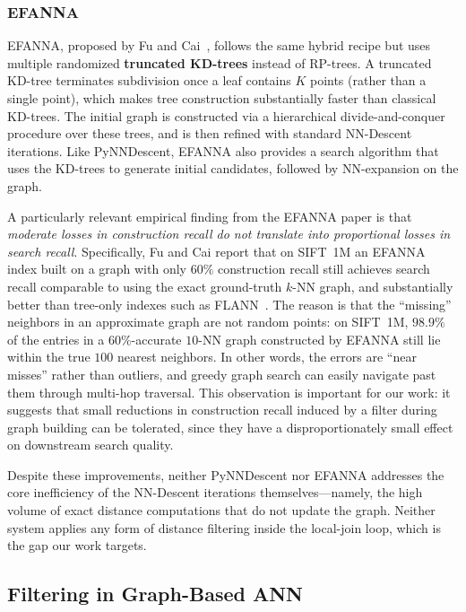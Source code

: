 \subsubsection{EFANNA}
\label{sec:efanna}

EFANNA, proposed by Fu and Cai~\cite{fu2016}, follows the same hybrid recipe but uses multiple randomized \textbf{truncated KD-trees} instead of RP-trees.
A truncated KD-tree terminates subdivision once a leaf contains $K$ points (rather than a single point), which makes tree construction substantially faster than classical KD-trees.
The initial graph is constructed via a hierarchical divide-and-conquer procedure over these trees, and is then refined with standard NN-Descent iterations.
Like PyNNDescent, EFANNA also provides a search algorithm that uses the KD-trees to generate initial candidates, followed by NN-expansion on the graph.

A particularly relevant empirical finding from the EFANNA paper is that \emph{moderate losses in construction recall do not translate into proportional losses in search recall}.
Specifically, Fu and Cai report that on SIFT~1M an EFANNA index built on a graph with only $60\%$ construction recall still achieves search recall comparable to using the exact ground-truth $k$-NN graph, and substantially better than tree-only indexes such as FLANN~\cite{muja2014}.
The reason is that the ``missing'' neighbors in an approximate graph are not random points: on SIFT~1M, $98.9\%$ of the entries in a $60\%$-accurate $10$-NN graph constructed by EFANNA still lie within the true $100$ nearest neighbors.
In other words, the errors are ``near misses'' rather than outliers, and greedy graph search can easily navigate past them through multi-hop traversal.
This observation is important for our work: it suggests that small reductions in construction recall induced by a filter during graph building can be tolerated, since they have a disproportionately small effect on downstream search quality.

Despite these improvements, neither PyNNDescent nor EFANNA addresses the core inefficiency of the NN-Descent iterations themselves---namely, the high volume of exact distance computations that do not update the graph.
Neither system applies any form of distance filtering inside the local-join loop, which is the gap our work targets.

\subsection{Filtering in Graph-Based ANN}
\label{sec:filtering}

